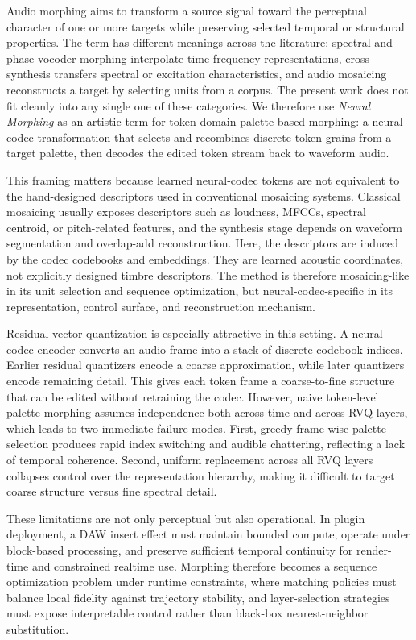 \documentclass[twoside,a4paper]{article}
\begin{document}
Audio morphing aims to transform a source signal toward the perceptual character of one or more targets while preserving selected temporal or structural properties. The term has different meanings across the literature: spectral and phase-vocoder morphing interpolate time-frequency representations, cross-synthesis transfers spectral or excitation characteristics, and audio mosaicing reconstructs a target by selecting units from a corpus. The present work does not fit cleanly into any single one of these categories. We therefore use \emph{Neural Morphing} as an artistic term for token-domain palette-based morphing: a neural-codec transformation that selects and recombines discrete token grains from a target palette, then decodes the edited token stream back to waveform audio.

This framing matters because learned neural-codec tokens are not equivalent to the hand-designed descriptors used in conventional mosaicing systems. Classical mosaicing usually exposes descriptors such as loudness, MFCCs, spectral centroid, or pitch-related features, and the synthesis stage depends on waveform segmentation and overlap-add reconstruction. Here, the descriptors are induced by the codec codebooks and embeddings. They are learned acoustic coordinates, not explicitly designed timbre descriptors. The method is therefore mosaicing-like in its unit selection and sequence optimization, but neural-codec-specific in its representation, control surface, and reconstruction mechanism.

Residual vector quantization is especially attractive in this setting. A neural codec encoder converts an audio frame into a stack of discrete codebook indices. Earlier residual quantizers encode a coarse approximation, while later quantizers encode remaining detail. This gives each token frame a coarse-to-fine structure that can be edited without retraining the codec. However, naive token-level palette morphing assumes independence both across time and across RVQ layers, which leads to two immediate failure modes. First, greedy frame-wise palette selection produces rapid index switching and audible chattering, reflecting a lack of temporal coherence. Second, uniform replacement across all RVQ layers collapses control over the representation hierarchy, making it difficult to target coarse structure versus fine spectral detail.

These limitations are not only perceptual but also operational. In plugin deployment, a DAW insert effect must maintain bounded compute, operate under block-based processing, and preserve sufficient temporal continuity for render-time and constrained realtime use. Morphing therefore becomes a sequence optimization problem under runtime constraints, where matching policies must balance local fidelity against trajectory stability, and layer-selection strategies must expose interpretable control rather than black-box nearest-neighbor substitution.
\end{document}
